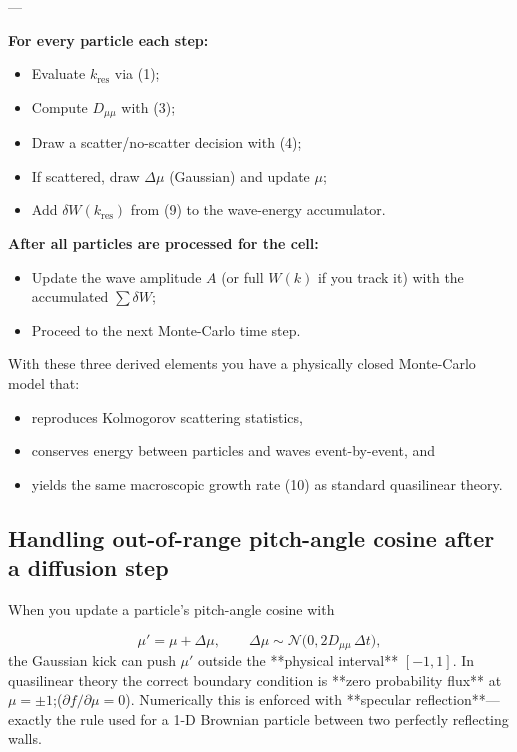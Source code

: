---


\begin{tcolorbox}[colframe=black, colback=white, title=Summary of the Algorithm]
\textbf{For every particle each step:}
\begin{itemize}
    \item Evaluate \( k_{\text{res}} \) via (1);
    \item Compute \( D_{\mu\mu} \) with (3);
    \item Draw a scatter/no-scatter decision with (4);
    \item If scattered, draw \( \Delta \mu \) (Gaussian) and update \( \mu \);
    \item Add \( \delta W(k_{\text{res}}) \) from (9) to the wave-energy accumulator.
\end{itemize}

\textbf{After all particles are processed for the cell:}
\begin{itemize}
    \item Update the wave amplitude \( A \) (or full \( W(k) \) if you track it) with the accumulated \( \sum \delta W \);
    \item Proceed to the next Monte-Carlo time step.
\end{itemize}


With these three derived elements you have a physically closed Monte-Carlo model that:
\begin{itemize}
    \item reproduces Kolmogorov scattering statistics,
    \item conserves energy between particles and waves event-by-event, and
    \item yields the same macroscopic growth rate (10) as standard quasilinear theory.
\end{itemize}
\end{tcolorbox}

\subsection{Handling out-of-range pitch-angle cosine after a diffusion step}

When you update a particle’s pitch-angle cosine with

$$
\mu'=\mu+\Delta\mu ,\qquad \Delta\mu\sim\mathcal N\bigl(0,2D_{\mu\mu}\,\Delta t\bigr),
$$
the Gaussian kick can push $\mu'$ outside the **physical interval** $[-1,1]$.  In quasilinear theory the correct boundary condition is **zero probability flux** at $\mu=\pm1$;($\partial f/\partial\mu=0$).
Numerically this is enforced with **specular reflection**—exactly the rule used for a 1-D Brownian particle between two perfectly reflecting walls.

